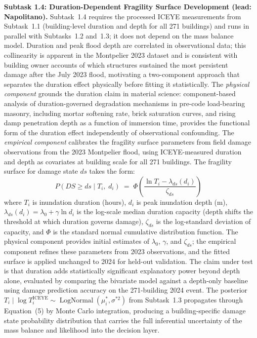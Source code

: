 \documentclass[11pt]{article}
\begin{document}
\textbf{Subtask 1.4: Duration-Dependent Fragility Surface Development
(lead: Napolitano).}
Subtask~1.4 requires the processed ICEYE measurements from Subtask~1.1 (building-level
duration and depth for all 271 buildings) and runs in parallel with Subtasks~1.2
and~1.3; it does not depend on the mass balance model.
Duration and peak flood depth are correlated in observational data; this
collinearity is apparent in the Montpelier 2023 dataset and is consistent with
building owner accounts of which structures sustained the most persistent damage
after the July 2023 flood, motivating a two-component approach that separates
the duration effect physically before fitting it statistically.
The \textit{physical component} grounds the duration claim in material science:
component-based analysis of duration-governed degradation mechanisms in pre-code
load-bearing masonry, including mortar softening rate, brick saturation curves,
and rising damp penetration depth as a function of immersion time, provides the
functional form of the duration effect independently of observational confounding.
The \textit{empirical component} calibrates the fragility surface parameters from
field damage observations from the 2023 Montpelier flood, using ICEYE-measured
duration and depth as covariates at building scale for all 271 buildings.
The fragility surface for damage state $ds$ takes the form:
\begin{equation}
  P(DS \geq ds \mid T_i,\; d_i) \;=\; \Phi\!\left(
    \frac{\ln T_i - \lambda_{ds}(d_i)}{\zeta_{ds}}\right)
\end{equation}
where $T_i$ is inundation duration (hours), $d_i$ is peak inundation depth (m),
$\lambda_{ds}(d_i) = \lambda_0 + \gamma \ln d_i$ is the log-scale median duration
capacity (depth shifts the threshold at which duration governs damage), $\zeta_{ds}$
is the log-standard deviation of capacity, and $\Phi$ is the standard normal
cumulative distribution function.
The physical component provides initial estimates of $\lambda_0$, $\gamma$, and
$\zeta_{ds}$; the empirical component refines these parameters from 2023 observations,
and the fitted surface is applied unchanged to 2024 for held-out validation.
The claim under test is that duration adds statistically significant explanatory
power beyond depth alone, evaluated by comparing the bivariate model against a
depth-only baseline using damage prediction accuracy on the 271-building 2024 event.
The posterior $T_i \mid \log T_i^{\mathrm{ICEYE}} \sim
\operatorname{LogNormal}(\mu_i^*, \sigma^{*2})$ from Subtask~1.3 propagates through
Equation~(5) by Monte Carlo integration, producing a building-specific damage state
probability distribution that carries the full inferential uncertainty of the mass
balance and likelihood into the decision layer.
\end{document}
